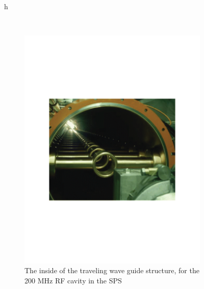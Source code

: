 \begin{figure}{h}
\begin{subfigure}[h]{0.45\textwidth}
      \end{subfigure}
      ~ %
      \begin{subfigure}[h]{0.45\textwidth}
        \includegraphics[width=\textwidth]{Figures/LHC_Diagrams/LHC__SPS__RFCavity_InsideView.pdf}
        \caption{The inside of the traveling wave guide structure,
          for the 200 MHz RF cavity in the SPS \cite{LHC:LHC_sps_rf_inside_image}}\label{fig:sps_rf_inside}
      \end{subfigure}
       ~ %
      \begin{subfigure}[h]{0.45\textwidth}

\end{subfigure}
\end{figure}
